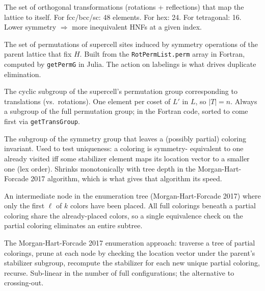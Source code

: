 \documentclass[11pt]{article}
\begin{document}
\begin{description}[leftmargin=2em, style=nextline]
\item[Point group / lattice point group]
The set of orthogonal transformations (rotations + reflections) that
map the lattice to itself. For fcc/bcc/sc: 48 elements. For hex: 24.
For tetragonal: 16. Lower symmetry $\Rightarrow$ more inequivalent
HNFs at a given index.

\item[Permutation group of a supercell $H$]
The set of permutations of supercell sites induced by symmetry
operations of the parent lattice that fix $H$. Built from the
\texttt{RotPermList.perm} array in Fortran, computed by
\texttt{getPermG} in Julia. The action on labelings is what drives
duplicate elimination.

\item[Translation group]
The cyclic subgroup of the supercell's permutation group corresponding
to translations (vs.\ rotations). One element per coset of $L'$ in $L$,
so $|T| = n$. Always a subgroup of the full permutation group; in the
Fortran code, sorted to come first via \texttt{getTransGroup}.

\item[Stabilizer subgroup of a coloring (or partial coloring)]
The subgroup of the symmetry group that leaves a (possibly partial)
coloring invariant. Used to test uniqueness: a coloring is symmetry-
equivalent to one already visited iff some stabilizer element maps
its location vector to a smaller one (lex order). Shrinks
monotonically with tree depth in the Morgan-Hart-Forcade 2017
algorithm, which is what gives that algorithm its speed.

\item[Partial coloring]
An intermediate node in the enumeration tree (Morgan-Hart-Forcade
2017) where only the first $\ell$ of $k$ colors have been placed.
All full colorings beneath a partial coloring share the
already-placed colors, so a single equivalence check on the partial
coloring eliminates an entire subtree.

\item[Recursive stabilizer (algorithm)]
The Morgan-Hart-Forcade 2017 enumeration approach: traverse a tree
of partial colorings, prune at each node by checking the location
vector under the parent's stabilizer subgroup, recompute the
stabilizer for each new unique partial coloring, recurse. Sub-linear
in the number of full configurations; the alternative to crossing-out.


\end{description}
\end{document}
